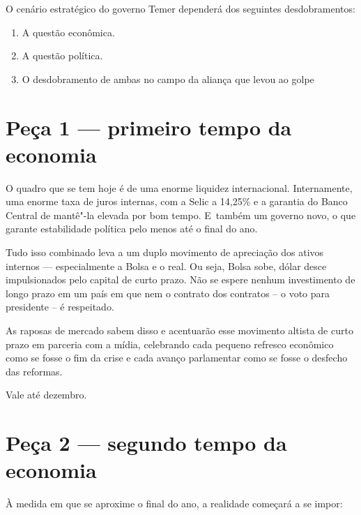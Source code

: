  

O cenário estratégico do governo Temer dependerá dos seguintes
desdobramentos:

\begin{enumerate}
\itemsep1pt\parskip0pt
\item
  A questão econômica.
\item
  A questão política.
\item
  O desdobramento de ambas no campo da aliança que levou ao golpe
\end{enumerate}

\section{Peça 1 --- primeiro tempo da economia}

O quadro que se tem hoje é de uma enorme liquidez internacional.
Internamente, uma enorme taxa de juros internas, com a Selic a 14,25\% e
a garantia do Banco Central de mantê"-la elevada por bom tempo. E~também
um governo novo, o que garante estabilidade política pelo menos até o
final do ano.

Tudo isso combinado leva a um duplo movimento de apreciação dos ativos
internos --- especialmente a Bolsa e o real. Ou seja, Bolsa sobe, dólar
desce impulsionados pelo capital de curto prazo. Não se espere nenhum
investimento de longo prazo em um país em que nem o contrato dos
contratos -- o voto para presidente -- é respeitado.

As raposas de mercado sabem disso e acentuarão esse movimento altista de
curto prazo em parceria com a mídia, celebrando cada pequeno refresco
econômico como se fosse o fim da crise e cada avanço parlamentar como se
fosse o desfecho das reformas.

Vale até dezembro.

\section{Peça 2 --- segundo tempo da economia}

À medida em que se aproxime o final do ano, a realidade começará a se
impor:

